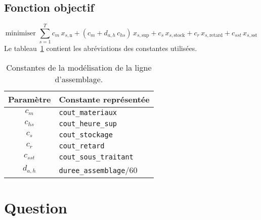 \documentclass[12pt,oneside,a4paper]{article}
\newcommand{\question}
{
\addtocounter{section}{1}
\section*{Question \thesection}
}
\newcommand{\myX}[2]{x_{#1,\text{#2}}}
\newcommand{\xSemaine}[1]{\myX{s}{#1}}
\newcommand{\xn}{\xSemaine{n}}
\newcommand{\xsup}{\xSemaine{sup}}
\newcommand{\xstock}{\xSemaine{stock}}
\newcommand{\xretard}{\xSemaine{retard}}
\newcommand{\xsst}{\xSemaine{sst}}
\begin{document}
\subsection*{Fonction objectif}
\[
  \mbox{minimiser } 
  \sum_{s=1}^{T} 
  c_m\, \xn + (c_m + d_{a,h} \, c_{hs})\, \xsup
  + c_s\, \xstock + c_r\, \xretard + c_{sst}\, \xsst
\]
Le tableau~\ref{tab:constantesQuestion1} contient les abréviations
des constantes utilisées.
\begin{table}[h]
  \begin{center}
  \begin{tabular}{|c|l|}
    \hline
    Paramètre & Constante représentée \\
    \hline
    \hline
    $c_m$ & \texttt{cout\_materiaux} \\
    \hline
    $c_{hs}$ & \texttt{cout\_heure\_sup} \\
    \hline
    $c_s$ & \texttt{cout\_stockage} \\
    \hline
    $c_r$ & \texttt{cout\_retard} \\
    \hline
    $c_{sst}$ & \texttt{cout\_sous\_traitant} \\
    \hline
    $d_{a,h}$ & \texttt{duree\_assemblage}/60 \\
    \hline
  \end{tabular}
  \caption{Constantes de la modélisation de la ligne d'assemblage.}
  \label{tab:constantesQuestion1}
  \end{center}
\end{table}

\question %
\end{document}
